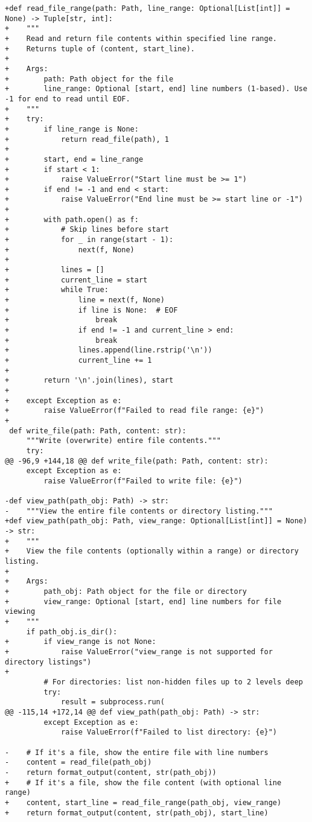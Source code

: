 \begin{lstlisting}[style=diffstyle]
+def read_file_range(path: Path, line_range: Optional[List[int]] = None) -> Tuple[str, int]:
+    """
+    Read and return file contents within specified line range.
+    Returns tuple of (content, start_line).
+    
+    Args:
+        path: Path object for the file
+        line_range: Optional [start, end] line numbers (1-based). Use -1 for end to read until EOF.
+    """
+    try:
+        if line_range is None:
+            return read_file(path), 1
+
+        start, end = line_range
+        if start < 1:
+            raise ValueError("Start line must be >= 1")
+        if end != -1 and end < start:
+            raise ValueError("End line must be >= start line or -1")
+
+        with path.open() as f:
+            # Skip lines before start
+            for _ in range(start - 1):
+                next(f, None)
+
+            lines = []
+            current_line = start
+            while True:
+                line = next(f, None)
+                if line is None:  # EOF
+                    break
+                if end != -1 and current_line > end:
+                    break
+                lines.append(line.rstrip('\n'))
+                current_line += 1
+
+        return '\n'.join(lines), start
+
+    except Exception as e:
+        raise ValueError(f"Failed to read file range: {e}")
+
 def write_file(path: Path, content: str):
     """Write (overwrite) entire file contents."""
     try:
@@ -96,9 +144,18 @@ def write_file(path: Path, content: str):
     except Exception as e:
         raise ValueError(f"Failed to write file: {e}")
 
-def view_path(path_obj: Path) -> str:
-    """View the entire file contents or directory listing."""
+def view_path(path_obj: Path, view_range: Optional[List[int]] = None) -> str:
+    """
+    View the file contents (optionally within a range) or directory listing.
+    
+    Args:
+        path_obj: Path object for the file or directory
+        view_range: Optional [start, end] line numbers for file viewing
+    """
     if path_obj.is_dir():
+        if view_range is not None:
+            raise ValueError("view_range is not supported for directory listings")
+        
         # For directories: list non-hidden files up to 2 levels deep
         try:
             result = subprocess.run(
@@ -115,14 +172,14 @@ def view_path(path_obj: Path) -> str:
         except Exception as e:
             raise ValueError(f"Failed to list directory: {e}")
 
-    # If it's a file, show the entire file with line numbers
-    content = read_file(path_obj)
-    return format_output(content, str(path_obj))
+    # If it's a file, show the file content (with optional line range)
+    content, start_line = read_file_range(path_obj, view_range)
+    return format_output(content, str(path_obj), start_line)
 

\end{lstlisting}
